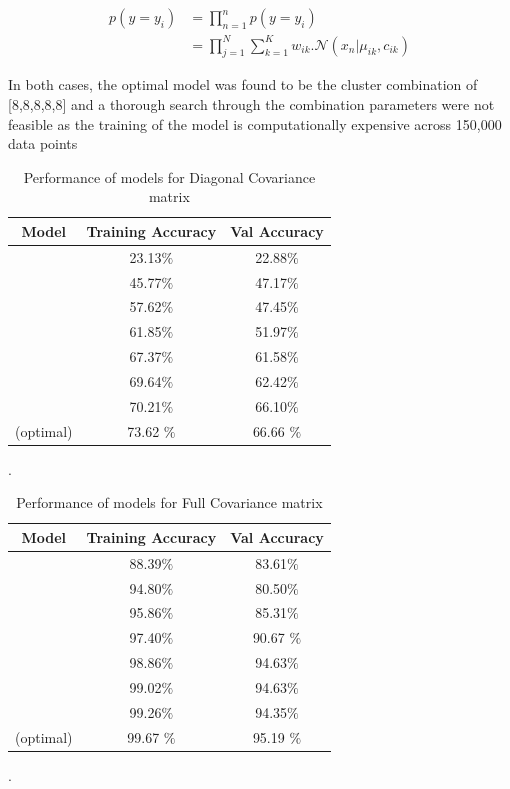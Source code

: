  \begin{align*}
      p(y=y_i) &= \prod_{n=1}^{n} p(y=y_i) \\
                    &= \prod_{j=1}^{N}\sum_{k=1}^{K}w_{ik}. \mathcal{N}(x_n|\mu_{ik},c_{ik})
  \end{align*}
  

In both cases, the optimal model was found to be the cluster combination of [8,8,8,8,8] and a thorough search through the combination parameters were not feasible as the training of the model is computationally expensive across 150,000 data points

{
\begin{table}[!h]
\centering
\begin{tabular}{ |c|c|c|  }
\hline
\rowcolor{lightgray} Model & Training Accuracy & Val Accuracy \\
\hline
[1,1,1,1,1] & 23.13$\%$  & 22.88$\%$ \\   
 \hline
[2,2,2,2,2] & 45.77$\%$  & 47.17$\%$ \\ 
\hline
[3,3,3,3,3] & 57.62$\%$  & 47.45$\%$ \\
\hline
[4,4,4,4,4] & 61.85$\%$  & 51.97$\%$ \\
\hline
[5,5,5,5,5] & 67.37$\%$  & 61.58$\%$ \\
\hline
[6,6,6,6,6] & 69.64$\%$  & 62.42$\%$ \\
\hline
[7,7,7,7,7] & 70.21$\%$  & 66.10$\%$ \\
\hline
[8,8,8,8,8](optimal)  & 73.62 $\%$  & 66.66 $\%$ \\
\hline
\end{tabular}
\caption{Performance of models for Diagonal Covariance matrix}.
\label{table:9}
\end{table}
}

{
\begin{table}[!ht]
\centering
\begin{tabular}{ |c|c|c|  }
\hline
\rowcolor{lightgray} Model & Training Accuracy & Val Accuracy \\
\hline
[1,1,1,1,1] & 88.39$\%$  & 83.61$\%$ \\   
 \hline
[2,2,2,2,2] & 94.80$\%$  & 80.50$\%$ \\ 
\hline
[3,3,3,3,3] & 95.86$\%$  & 85.31$\%$ \\
\hline
[4,4,4,4,4] & 97.40$\%$  &  90.67 $\%$ \\
\hline
[5,5,5,5,5] & 98.86$\%$  & 94.63$\%$ \\
\hline
[6,6,6,6,6] & 99.02$\%$  & 94.63$\%$ \\
\hline
[7,7,7,7,7] & 99.26$\%$  & 94.35$\%$ \\
\hline
[8,8,8,8,8](optimal)  &  99.67 $\%$  & 95.19 $\%$ \\
\hline
\end{tabular}
\caption{Performance of models for Full Covariance matrix}.
\label{table:10}
\end{table}
}
\newpage




